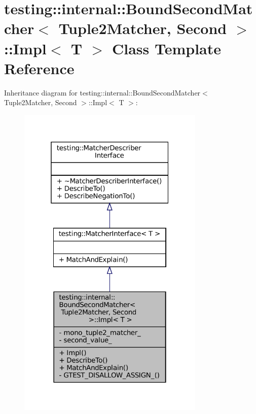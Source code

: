 \hypertarget{classtesting_1_1internal_1_1BoundSecondMatcher_1_1Impl}{}\section{testing\+:\+:internal\+:\+:Bound\+Second\+Matcher$<$ Tuple2\+Matcher, Second $>$\+:\+:Impl$<$ T $>$ Class Template Reference}
\label{classtesting_1_1internal_1_1BoundSecondMatcher_1_1Impl}


Inheritance diagram for testing\+:\+:internal\+:\+:Bound\+Second\+Matcher$<$ Tuple2\+Matcher, Second $>$\+:\+:Impl$<$ T $>$\+:
\nopagebreak
\begin{figure}[H]
\begin{center}
\leavevmode
\includegraphics[width=253pt]{classtesting_1_1internal_1_1BoundSecondMatcher_1_1Impl__inherit__graph}
\end{center}
\end{figure}


